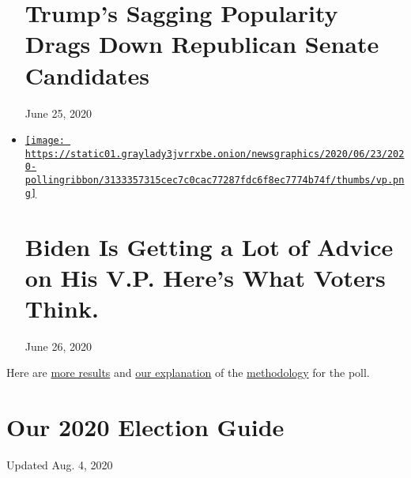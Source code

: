 \begin{itemize}
{  \section{Trump's Sagging Popularity Drags Down Republican Senate
  Candidates}\label{trumps-sagging-popularity-drags-down-republican-senate-candidates}}

  June 25, 2020
\item
  \href{https://www.nytimes3xbfgragh.onion/2020/06/26/us/politics/biden-vice-president-voters.html}{\texttt{[image: https://static01.graylady3jvrrxbe.onion/newsgraphics/2020/06/23/2020-pollingribbon/3133357315cec7c0cac77287fdc6f8ec7774b74f/thumbs/vp.png]}}

  \href{https://www.nytimes3xbfgragh.onion/2020/06/26/us/politics/biden-vice-president-voters.html}{}

  \hypertarget{biden-is-getting-a-lot-of-advice-on-his-vp-heres-what-voters-think}{%
  \section{Biden Is Getting a Lot of Advice on His V.P. Here's What
  Voters
  Think.}\label{biden-is-getting-a-lot-of-advice-on-his-vp-heres-what-voters-think}}

  June 26, 2020
\end{itemize}

Here are
\href{https://int.graylady3jvrrxbe.onion/data/documenttools/crosstabs0624release/18307fed6cb2dc5a/full.pdf}{more
results} and
\href{https://www.nytimes3xbfgragh.onion/2020/06/23/upshot/poll-2020-election-method.html}{our
explanation} of the
\href{https://int.graylady3jvrrxbe.onion/data/documenttools/nyt-siena-poll-methodology-june-2020/f6f533b4d07f4cbe/full.pdf}{methodology}
for the poll.

\hypertarget{our-2020-election-guide}{%
\section{Our 2020 Election Guide}\label{our-2020-election-guide}}

Updated Aug. 4, 2020

